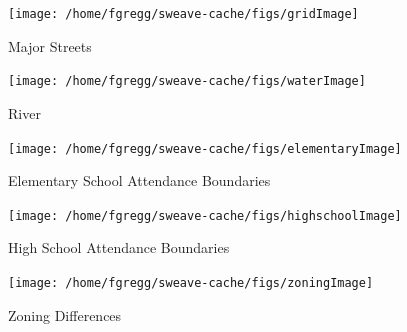 \documentclass[12pt,letter]{article}\usepackage[]{graphicx}\usepackage[]{color}
\newenvironment{knitrout}{}{} %
\begin{document}
\begin{figure}
\begin{knitrout}
\color{fgcolor}

{\centering \texttt{[image: /home/fgregg/sweave-cache/figs/gridImage]} 

}



\end{knitrout}

\caption{Major Streets}
\end{figure}

\begin{figure}
\begin{knitrout}
\color{fgcolor}

{\centering \texttt{[image: /home/fgregg/sweave-cache/figs/waterImage]} 

}



\end{knitrout}

\caption{River}
\end{figure}

\begin{figure}
\begin{knitrout}
\color{fgcolor}

{\centering \texttt{[image: /home/fgregg/sweave-cache/figs/elementaryImage]} 

}



\end{knitrout}

\caption{Elementary School Attendance Boundaries}
\end{figure}

\begin{figure}
\begin{knitrout}
\color{fgcolor}

{\centering \texttt{[image: /home/fgregg/sweave-cache/figs/highschoolImage]} 

}



\end{knitrout}

\caption{High School Attendance Boundaries}
\end{figure}

\begin{figure}
\begin{knitrout}
\color{fgcolor}

{\centering \texttt{[image: /home/fgregg/sweave-cache/figs/zoningImage]} 

}



\end{knitrout}

\caption{Zoning Differences}
\end{figure}
\end{document}
